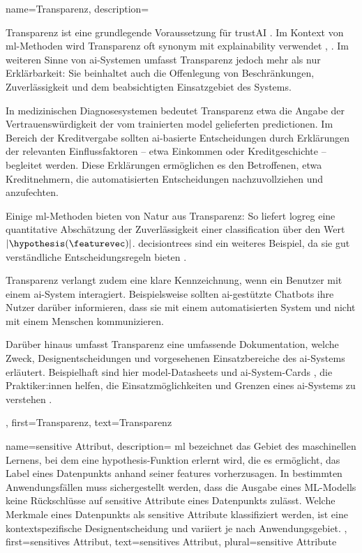 {{{
{name={Transparenz},
	description={Transparenz ist eine grundlegende Voraussetzung für 
		\gls{trustAI} \cite{HLEGTrustworhtyAI}. Im Kontext von \gls{ml}-Methoden wird Transparenz 
		oft synonym mit \gls{explainability} verwendet \cite{JunXML2020}, \cite{gallese2023ai}. 
		Im weiteren Sinne von \gls{ai}-Systemen umfasst Transparenz jedoch mehr als nur 
		Erklärbarkeit: Sie beinhaltet auch die Offenlegung von Beschränkungen, Zuverlässigkeit 
		und dem beabsichtigten Einsatzgebiet des Systems. 
		
		In medizinischen Diagnosesystemen bedeutet Transparenz etwa die Angabe der Vertrauenswürdigkeit 
		der vom trainierten \gls{model} gelieferten \gls{prediction}en. Im Bereich der Kreditvergabe 
		sollten \gls{ai}-basierte Entscheidungen durch Erklärungen der relevanten Einflussfaktoren 
		– etwa Einkommen oder Kreditgeschichte – begleitet werden. Diese Erklärungen ermöglichen es 
		den Betroffenen, etwa Kreditnehmern, die automatisierten Entscheidungen nachzuvollziehen und anzufechten. 
		
		Einige \gls{ml}-Methoden bieten von Natur aus Transparenz: So liefert \gls{logreg} 
		eine quantitative Abschätzung der Zuverlässigkeit einer \gls{classification} über den Wert $|\hypothesis(\featurevec)|$. 
		\Gls{decisiontree}s sind ein weiteres Beispiel, da sie gut verständliche Entscheidungsregeln 
		bieten \cite{rudin2019stop}.
		
		Transparenz verlangt zudem eine klare Kennzeichnung, wenn ein Benutzer mit einem \gls{ai}-System interagiert. 
		Beispielsweise sollten \gls{ai}-gestützte Chatbots ihre Nutzer darüber informieren, dass sie mit einem automatisierten 
		System und nicht mit einem Menschen kommunizieren. 
		
		Darüber hinaus umfasst Transparenz eine umfassende Dokumentation, welche Zweck, Designentscheidungen 
		und vorgesehenen Einsatzbereiche des \gls{ai}-Systems erläutert. Beispielhaft sind hier 
		\gls{model}-Datasheets \cite{DatasheetData2021} und \gls{ai}-System-Cards \cite{10.1145/3287560.3287596}, 
		die Praktiker:innen helfen, die Einsatzmöglichkeiten und Grenzen eines \gls{ai}-Systems zu verstehen \cite{Shahriari2017}.},
	first={Transparenz}, text={Transparenz} 
}

{
	name={sensitive Attribut},
	description={
		\gls{ml} bezeichnet das Gebiet des maschinellen Lernens, bei dem 
		eine \gls{hypothesis}-Funktion erlernt wird, die es ermöglicht, das \gls{Label} eines \gls{Datenpunkts} 
		anhand seiner \glspl{feature} vorherzusagen. In bestimmten Anwendungsfällen muss sichergestellt werden, 
		dass die Ausgabe eines \gls{ML}-Modells keine Rückschlüsse auf sensitive Attribute eines \gls{Datenpunkts} zulässt. Welche Merkmale eines \gls{Datenpunkts} als sensitive Attribute klassifiziert werden, ist eine kontextspezifische Designentscheidung und variiert je nach Anwendungsgebiet.
	},
	first={sensitives Attribut},
	text={sensitives Attribut}, plural={sensitive Attribute}
}


}}}
